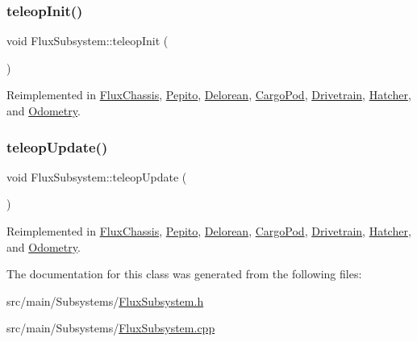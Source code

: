\mbox{\label{classFluxSubsystem_aec6d05e4f80c3783684598fb92ad2e55}} 
\subsubsection{\texorpdfstring{teleop\+Init()}{teleopInit()}}
{\footnotesize\ttfamily void Flux\+Subsystem\+::teleop\+Init (\begin{DoxyParamCaption}{ }\end{DoxyParamCaption})\hspace{0.3cm}{\ttfamily [virtual]}}



Reimplemented in \hyperlink{classFluxChassis_af0c4310e2c5cf06b68b4ca6a740ca406}{Flux\+Chassis}, \hyperlink{classPepito_a5001bee2d7dcc225c87ac36d5eddc452}{Pepito}, \hyperlink{classDelorean_a789c6e4e70f4e2cfdf944d1a1a149509}{Delorean}, \hyperlink{classCargoPod_a2da82d2620414330cd775ac1c7f0718a}{Cargo\+Pod}, \hyperlink{classDrivetrain_a12d7edbb3a1b5d4ffa4ecb381c1ab115}{Drivetrain}, \hyperlink{classHatcher_ad51238ccec9093e1fa9c63f8f3aafa12}{Hatcher}, and \hyperlink{classOdometry_adea396ff746c1f3ad73ea79d19a75356}{Odometry}.

\mbox{\label{classFluxSubsystem_a327d76affc60699bfa62563e364e42f5}} 
\subsubsection{\texorpdfstring{teleop\+Update()}{teleopUpdate()}}
{\footnotesize\ttfamily void Flux\+Subsystem\+::teleop\+Update (\begin{DoxyParamCaption}{ }\end{DoxyParamCaption})\hspace{0.3cm}{\ttfamily [virtual]}}



Reimplemented in \hyperlink{classFluxChassis_af7ec99f668e784fec47bb2bea24fff63}{Flux\+Chassis}, \hyperlink{classPepito_ac19e921b35d2d76cb5b6a2105b26f568}{Pepito}, \hyperlink{classDelorean_a6053dfc106d71fcffa30bac0f5e9b5b8}{Delorean}, \hyperlink{classCargoPod_a29fd74f10b26e3db4348e039969fb173}{Cargo\+Pod}, \hyperlink{classDrivetrain_a3b6bdf96a9388285c7560b2fedfc7ca1}{Drivetrain}, \hyperlink{classHatcher_a91517b2f54f6c8fc0f27506963a71d20}{Hatcher}, and \hyperlink{classOdometry_ae42a153c786b5c805b073509394951f9}{Odometry}.



The documentation for this class was generated from the following files\+:\begin{DoxyCompactItemize}
\item 
src/main/\+Subsystems/\hyperlink{FluxSubsystem_8h}{Flux\+Subsystem.\+h}\item 
src/main/\+Subsystems/\hyperlink{FluxSubsystem_8cpp}{Flux\+Subsystem.\+cpp}\end{DoxyCompactItemize}
